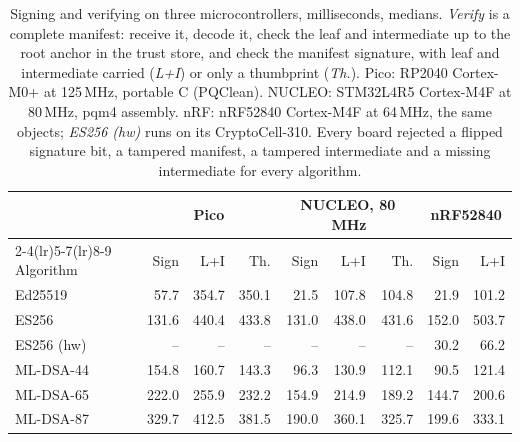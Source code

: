 \begin{table}[t]
\caption{Signing and verifying on three microcontrollers, milliseconds, medians. \emph{Verify} is a complete manifest: receive it, decode it, check the leaf and intermediate up to the root anchor in the trust store, and check the manifest signature, with leaf and intermediate carried (\emph{L+I}) or only a thumbprint (\emph{Th.}). Pico: RP2040 Cortex-M0+ at 125\,MHz, portable C (PQClean). NUCLEO: STM32L4R5 Cortex-M4F at 80\,MHz, pqm4 assembly. nRF: nRF52840 Cortex-M4F at 64\,MHz, the same objects; \emph{ES256 (hw)} runs on its CryptoCell-310. Every board rejected a flipped signature bit, a tampered manifest, a tampered intermediate and a missing intermediate for every algorithm.}
\label{tab:mcu}
\small
\setlength{\tabcolsep}{4pt}
\begin{tabular}{lrrrrrrrr}
\toprule
 & \multicolumn{3}{c}{Pico} & \multicolumn{3}{c}{NUCLEO, 80\,MHz} & \multicolumn{2}{c}{nRF52840}\\
\cmidrule(lr){2-4}\cmidrule(lr){5-7}\cmidrule(lr){8-9}
Algorithm & Sign & L+I & Th. & Sign & L+I & Th. & Sign & L+I\\
\midrule
Ed25519 & 57.7 & 354.7 & 350.1 & 21.5 & 107.8 & 104.8 & 21.9 & 101.2\\
ES256 & 131.6 & 440.4 & 433.8 & 131.0 & 438.0 & 431.6 & 152.0 & 503.7\\
ES256 (hw) & -- & -- & -- & -- & -- & -- & 30.2 & 66.2\\
ML-DSA-44 & 154.8 & 160.7 & 143.3 & 96.3 & 130.9 & 112.1 & 90.5 & 121.4\\
ML-DSA-65 & 222.0 & 255.9 & 232.2 & 154.9 & 214.9 & 189.2 & 144.7 & 200.6\\
ML-DSA-87 & 329.7 & 412.5 & 381.5 & 190.0 & 360.1 & 325.7 & 199.6 & 333.1\\
\bottomrule
\end{tabular}
\end{table}
